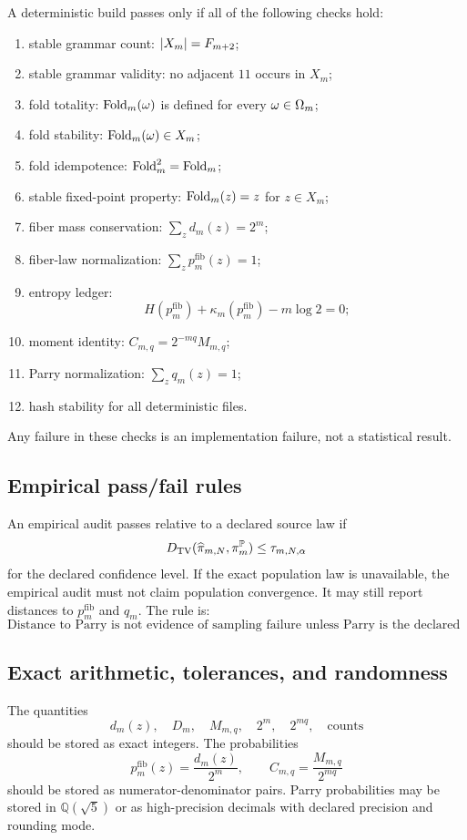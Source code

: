 A deterministic build passes only if all of the following checks hold:
\begin{enumerate}[leftmargin=2em]
\item stable grammar count: \(\left|X_m\right|=F_{m+2}\);
\item stable grammar validity: no adjacent \(11\) occurs in \(X_m\);
\item fold totality: \(\operatorname{Fold}_m(\omega)\) is defined for every \(\omega\in\Omega_m\);
\item fold stability: \(\operatorname{Fold}_m(\omega)\in X_m\);
\item fold idempotence: \(\operatorname{Fold}_m^2=\operatorname{Fold}_m\);
\item stable fixed-point property: \(\operatorname{Fold}_m(z)=z\) for \(z\in X_m\);
\item fiber mass conservation: \(\sum_zd_m(z)=2^m\);
\item fiber-law normalization: \(\sum_zp_m^{\mathrm{fib}}(z)=1\);
\item entropy ledger:
\[
H(p_m^{\mathrm{fib}})+\kappa_m(p_m^{\mathrm{fib}})-m\log2=0;
\]
\item moment identity: \(C_{m,q}=2^{-mq}M_{m,q}\);
\item Parry normalization: \(\sum_zq_m(z)=1\);
\item hash stability for all deterministic files.
\end{enumerate}
Any failure in these checks is an implementation failure, not a statistical result.

\subsection{Empirical pass/fail rules}

An empirical audit passes relative to a declared source law if
\[
D_{\mathrm{TV}}(\widehat\pi_{m,N},\pi_m^{\mathbb{P}})\le \tau_{m,N,\alpha}
\]
for the declared confidence level.  If the exact population law is unavailable, the empirical audit must not claim population convergence.  It may still report distances to \(p_m^{\mathrm{fib}}\) and \(q_m\).  The rule is:
\[
\boxed{\text{Distance to Parry is not evidence of sampling failure unless Parry is the declared source law.}}
\]

\subsection{Exact arithmetic, tolerances, and randomness}

The quantities
\[
d_m(z),\quad D_m,\quad M_{m,q},\quad 2^m,\quad 2^{mq},\quad \text{counts}
\]
should be stored as exact integers.  The probabilities
\[
p_m^{\mathrm{fib}}(z)=\frac{d_m(z)}{2^m},
\qquad
C_{m,q}=\frac{M_{m,q}}{2^{mq}}
\]
should be stored as numerator-denominator pairs.  Parry probabilities may be stored in \(\mathbb Q(\sqrt5)\) or as high-precision decimals with declared precision and rounding mode.

